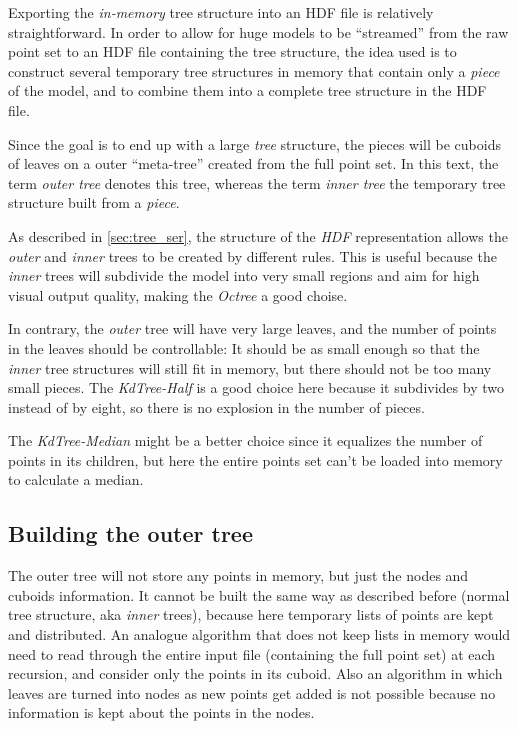 \documentclass[a4paper,10pt,abstracton,notitlepage]{scrreprt}
\begin{document}
Exporting the \emph{in-memory} tree structure into an HDF file is relatively straightforward. In order to allow for huge models to be ``streamed'' from the raw point set to an HDF file containing the tree structure, the idea used is to construct several temporary tree structures in memory that contain only a \emph{piece} of the model, and to combine them into a complete tree structure in the HDF file.

Since the goal is to end up with a large \emph{tree} structure, the pieces will be cuboids of leaves on a outer ``meta-tree'' created from the full point set. In this text, the term \emph{outer tree} denotes this tree, whereas the term \emph{inner tree} the temporary tree structure built from a \emph{piece}.

As described in \ref{sec:tree_ser}, the structure of the \emph{HDF} representation allows the \emph{outer} and \emph{inner} trees to be created by different rules. This is useful because the \emph{inner} trees will subdivide the model into very small regions and aim for high visual output quality, making the \emph{Octree} a good choise.

In contrary, the \emph{outer} tree will have very large leaves, and the number of points in the leaves should be controllable: It should be as small enough so that the \emph{inner} tree structures will still fit in memory, but there should not be too many small pieces. The \emph{KdTree-Half} is a good choice here because it subdivides by two instead of by eight, so there is no explosion in the number of pieces.

The \emph{KdTree-Median} might be a better choice since it equalizes the number of points in its children, but here the entire points set can't be loaded into memory to calculate a median.

\subsection{Building the outer tree}
The outer tree will not store any points in memory, but just the nodes and cuboids information. It cannot be built the same way as described before (normal tree structure, aka \emph{inner} trees), because here temporary lists of points are kept and distributed. An analogue algorithm that does not keep lists in memory would need to read through the entire input file (containing the full point set) at each recursion, and consider only the points in its cuboid. Also an algorithm in which leaves are turned into nodes as new points get added is not possible because no information is kept about the points in the nodes.
\end{document}
